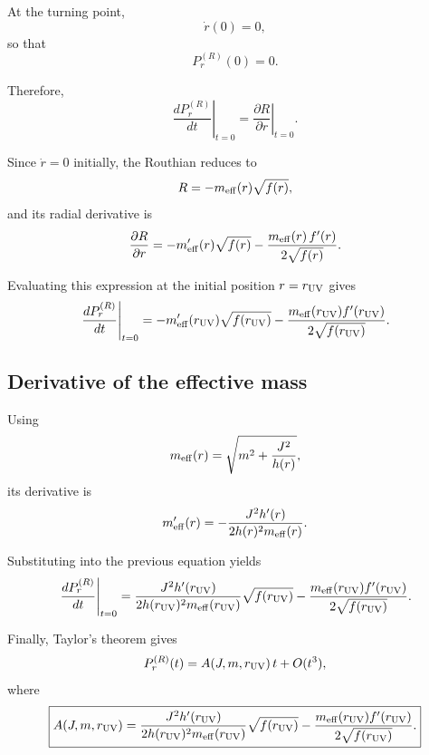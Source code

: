 \documentclass[11pt]{article}
\begin{document}
At the turning point,
\begin{equation}
\dot r(0)=0,
\end{equation}
so that
\begin{equation}
P_r^{(R)}(0)=0.
\end{equation}

Therefore,
\begin{equation}
\left.
\frac{dP_r^{(R)}}{dt}
\right|_{t=0}
=
\left.
\frac{\partial R}{\partial r}
\right|_{t=0}.
\end{equation}

Since $\dot r=0$ initially, the Routhian reduces to
\begin{equation}
R
=
-
m_{\rm eff}(r)
\sqrt{f(r)},
\end{equation}
and its radial derivative is
\begin{equation}
\frac{\partial R}{\partial r}
=
-
m_{\rm eff}'(r)\sqrt{f(r)}
-
\frac{
m_{\rm eff}(r)\,
f'(r)
}
{
2\sqrt{f(r)}
}.
\end{equation}

Evaluating this expression at the initial position $r=r_{\rm UV}$ gives
\begin{equation}
\left.
\frac{dP_r^{(R)}}{dt}
\right|_{t=0}
=
-
m_{\rm eff}'(r_{\rm UV})
\sqrt{f(r_{\rm UV})}
-
\frac{
m_{\rm eff}(r_{\rm UV})
f'(r_{\rm UV})
}
{
2\sqrt{f(r_{\rm UV})}
}.
\end{equation}

\subsection{Derivative of the effective mass}

Using
\begin{equation}
m_{\rm eff}(r)
=
\sqrt{
m^2+\frac{J^2}{h(r)}
},
\end{equation}
its derivative is
\begin{equation}
m_{\rm eff}'(r)
=
-
\frac{
J^2h'(r)
}
{
2h(r)^2m_{\rm eff}(r)
}.
\end{equation}

Substituting into the previous equation yields
\begin{equation}
\left.
\frac{dP_r^{(R)}}{dt}
\right|_{t=0}
=
\frac{
J^2h'(r_{\rm UV})
}
{
2h(r_{\rm UV})^2
m_{\rm eff}(r_{\rm UV})
}
\sqrt{f(r_{\rm UV})}
-
\frac{
m_{\rm eff}(r_{\rm UV})
f'(r_{\rm UV})
}
{
2\sqrt{f(r_{\rm UV})}
}.
\end{equation}

Finally, Taylor's theorem gives
\begin{equation}
P_r^{(R)}(t)
=
A(J,m,r_{\rm UV})\,t
+
O(t^3),
\end{equation}
where
\begin{equation}
\boxed{
A(J,m,r_{\rm UV})
=
\frac{
J^2h'(r_{\rm UV})
}
{
2h(r_{\rm UV})^2
m_{\rm eff}(r_{\rm UV})
}
\sqrt{f(r_{\rm UV})}
-
\frac{
m_{\rm eff}(r_{\rm UV})
f'(r_{\rm UV})
}
{
2\sqrt{f(r_{\rm UV})}
}.
}
\label{eq:A-general}
\end{equation}
\end{document}
